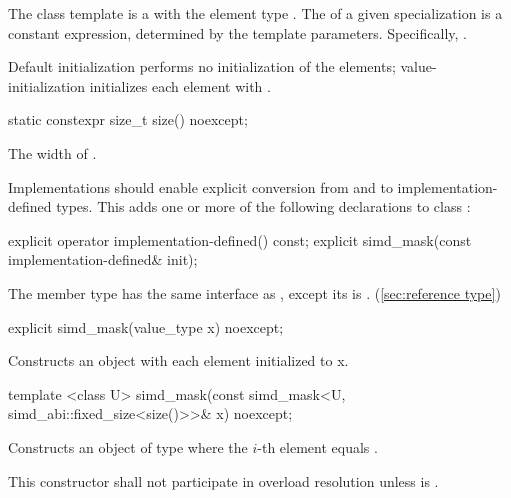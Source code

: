

\pnum The class template \mask is a \dataparalleltype with the element type \bool.
The \width of a given \mask specialization is a constant expression, determined by the template parameters.
Specifically, .


\pnum Default initialization performs no initialization of the elements; value-initialization initializes each element with \false.

\begin{itemdecl}
static constexpr size_t size() noexcept;
\end{itemdecl}
\begin{itemdescr}
  \pnum\returns The width of \simd[<T, Abi>].
\end{itemdescr}

\pnum Implementations should enable explicit conversion from and to implementation-defined types.
This adds one or more of the following declarations to class \mask:
\begin{itemdecl}
explicit operator implementation-defined() const;
explicit simd_mask(const implementation-defined& init);
\end{itemdecl}

\pnum The member type  has the same interface as , except its  is \bool.
(\ref{sec:reference type})

\begin{itemdecl}
explicit simd_mask(value_type x) noexcept;
\end{itemdecl}
\begin{itemdescr}
  \pnum\effects Constructs an object with each element initialized to \code x.
\end{itemdescr}

\begin{itemdecl}
template <class U> simd_mask(const simd_mask<U, simd_abi::fixed_size<size()>>& x) noexcept;
\end{itemdecl}
\begin{itemdescr}
  \pnum\effects Constructs an object of type \mask where the $i$-th element equals  \foralli.

  \pnum\remarks This constructor shall not participate in overload resolution unless  is \fixedsizescoped{}.
\end{itemdescr}

